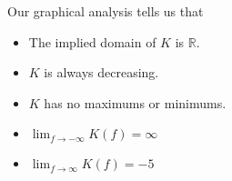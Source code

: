 \documentclass{ximera}
\begin{document}
\begin{example}
\begin{image}
\end{image}





Our graphical analysis tells us that

\begin{itemize}
\item The implied domain of $K$ is $\mathbb{R}$.
\item $K$ is always decreasing.
\item $K$ has no maximums or minimums.
\item $\lim_{f \to -\infty} K(f) = \infty$
\item $\lim_{f \to \infty} K(f) = -5$
\end{itemize}


\end{example}
\end{document}
